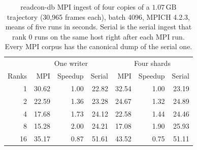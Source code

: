 \begin{table}[ht]
\centering
\small
\caption{readcon-db MPI ingest of four copies of a \(1.07\,\mathrm{GB}\) trajectory (30{,}965 frames each), batch 4096, MPICH 4.2.3, means of five runs in seconds.
Serial is the serial ingest that rank 0 runs on the same host right after each MPI run.
Every MPI corpus has the canonical dump of the serial one.}
\label{tab:dbmpi}
\begin{tabular}{rrrrrrr}
\toprule
& \multicolumn{3}{c}{One writer} & \multicolumn{3}{c}{Four shards} \\
Ranks & MPI & Speedup & Serial & MPI & Speedup & Serial \\
\midrule
1 & 30.62 & 1.00 & 22.82 & 32.54 & 1.00 & 23.19 \\
2 & 22.59 & 1.36 & 23.28 & 24.67 & 1.32 & 24.89 \\
4 & 17.68 & 1.73 & 24.12 & 22.58 & 1.44 & 24.46 \\
8 & 15.28 & 2.00 & 24.21 & 17.08 & 1.90 & 25.93 \\
16 & 35.17 & 0.87 & 51.61 & 43.52 & 0.75 & 51.11 \\
\bottomrule
\end{tabular}
\end{table}
